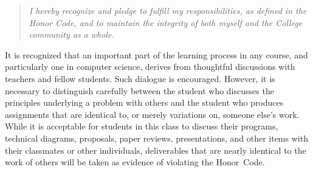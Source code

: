 \documentclass[11pt]{article} %
\begin{document}
\vspace*{-.1in}
\begin{quote}
\emph{I hereby recognize and pledge to fulfill my responsibilities, as defined in the Honor Code, and to maintain the integrity of both myself and the College community as a whole.}
\end{quote}
\vspace*{-.15in}

\noindent It is recognized that an important part of the learning process in any course, and particularly one in computer science, derives from thoughtful discussions with teachers and fellow students.  Such dialogue is encouraged. However, it is necessary to distinguish carefully between the student who discusses the principles underlying a problem with others and the student who produces assignments that are identical to, or merely variations on, someone else's work.  While it is acceptable for students in this class to discuss their programs, technical diagrams, proposals, paper reviews, presentations, and other items with their classmates or other individuals, deliverables that are nearly identical to the work of others will be taken as evidence of violating the \mbox{Honor Code}.
\end{document}
